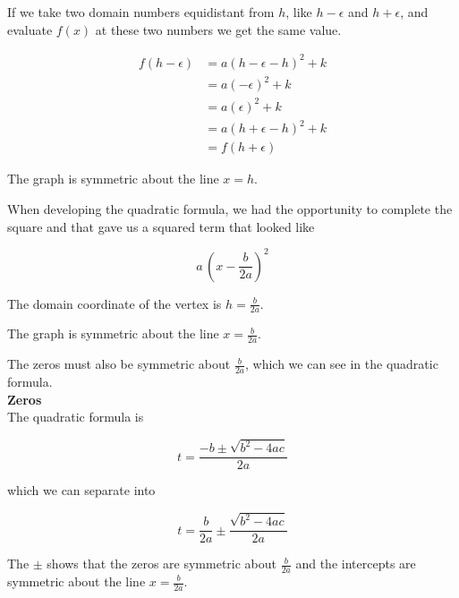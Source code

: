 \documentclass{ximera}
\begin{document}
If we take two domain numbers equidistant from $h$, like $h - \epsilon$ and $h + \epsilon$, and evaluate $f(x)$ at these two numbers we get the same value.


\begin{align*}
f(h - \epsilon) & = a (h - \epsilon - h)^2 + k \\
& = a (-\epsilon)^2 + k  \\
& = a (\epsilon)^2 + k  \\
& = a (h + \epsilon - h)^2 + k \\
& = f(h + \epsilon)
\end{align*}


The graph is symmetric about the line $x = h$.


When developing the quadratic formula, we had the opportunity to complete the square and that gave us a squared term that looked like 

\[  a \, \left(x - \frac{b}{2a}\right)^2       \]


The domain coordinate of the vertex is $h = \frac{b}{2a}$.


The graph is symmetric about the line $x = \frac{b}{2a}$.






The zeros must also be symmetric about $\frac{b}{2a}$, which we can see in the quadratic formula. \\





\textbf{Zeros} \\

The quadratic formula is

\[ t  =   \frac{-b \pm \sqrt{b^2 - 4 a c}}{2a}      \]



which we can separate into 



\[ t  =   \frac{b}{2a} \pm \frac{\sqrt{b^2 - 4 a c}}{2a}      \]


The $\pm$ shows that the zeros are symmetric about $\frac{b}{2a}$ and the intercepts are symmetric about the line $x = \frac{b}{2a}$.
\end{document}
